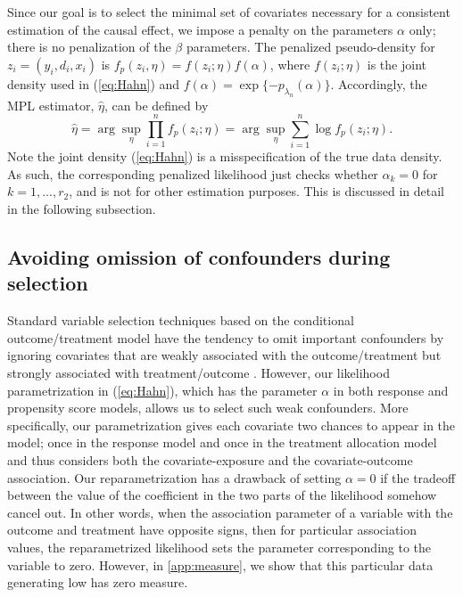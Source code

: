 \documentclass[11pt]{statsoc}
\begin{document}
Since our goal is to select the minimal set of covariates necessary  for a consistent estimation of the causal effect, we impose a penalty on the parameters $\alpha$ only; there is no penalization of the $\beta$ parameters. The penalized pseudo-density for $z_i=(y_i,d_i,x_i)$ is $f_p(z_i,\eta)
=f(z_i;\eta) f(\alpha)$, where $f(z_i;\eta)$ is the joint density used in (\ref{eq:Hahn}) and $f(\alpha)=\exp\{-p_{\lambda_n}(\alpha)\}$. Accordingly, the
MPL estimator, $\widehat \eta$, can be defined by
\[
\widehat \eta =  \arg \sup_{\eta}\prod_{i=1}^n f_p(z_i; \eta) = \arg \sup_{\eta} \sum_{i=1}^n \log f_p(z_i; \eta).
\]
Note the joint density (\ref{eq:Hahn}) is a misspecification of the true data density. As such, the corresponding penalized likelihood just  checks whether $\alpha_k=0$ for $k=1,...,r_2$, and is not for other estimation purposes. This is discussed in detail in the following subsection.

\subsection{Avoiding omission of confounders during selection}

Standard variable selection techniques based on the conditional outcome/treatment model have the tendency to omit important confounders by ignoring covariates that are weakly associated with the outcome/treatment but strongly associated with treatment/outcome \citep{vansteelandt2010model}. However, our likelihood parametrization in (\ref{eq:Hahn}),  which has the parameter $\alpha$ in both response and propensity score models, allows us to select such weak confounders. More specifically, our parametrization gives each covariate two chances to appear in the model; once in the response model and once in the treatment allocation model and thus considers both the covariate-exposure and the covariate-outcome association.  Our reparametrization has a drawback of setting $\alpha=0$ if the tradeoff between the value of the coefficient in the two parts of the likelihood somehow cancel out. In other words, when  the association parameter of a variable with the outcome and treatment have opposite signs, then for  particular association values, the reparametrized likelihood sets the parameter corresponding to the variable to zero.  However, in \ref{app:measure}, we show that this particular data generating low has zero measure.
 
\end{document}
